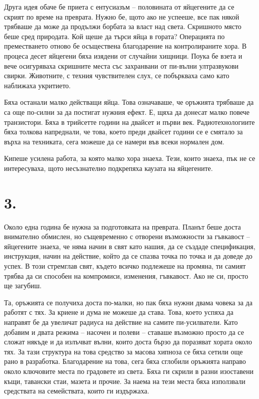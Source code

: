 \documentclass[ebook,openany,12pt]{memoir}
\begin{document}
Друга идея обаче бе приета с ентусиазъм – половината от яйцегените да се скрият по време на преврата. Нужно бе, щото ако не успееше, все пак някой трябваше да може да продължи борбата за власт над света. Скришното място беше сред природата. Кой щеше да търси яйца в гората? Операцията по преместването отново бе осъществена благодарение на контролираните хора. В процеса десет яйцегени бяха изядени от случайни хищници. Поука бе взета и вече осигуряваха скришните места със захранвани от пи-вълни ултразвукови свирки. Животните, с техния чувствителен слух, се побъркваха само като наближаха укритието.

Бяха останали малко действащи яйца. Това означаваше, че оръжията трябваше да са още по-силни за да постигат нужния ефект. Е, щяха да донесат малко повече транзистори. Бяха в трийсетте години на двайсет и първи век. Радиотехнологиите бяха толкова напреднали, че това, което преди двайсет години се е смятало за върха на техниката, сега можеше да се намери във всеки нормален дом.

Кипеше усилена работа, за която малко хора знаеха. Тези, които знаеха, пък не се интересуваха, щото несъзнателно подкрепяха каузата на яйцегените.

\section*{3.}

Около една година бе нужна за подготовката на преврата. Планът беше доста внимателно обмислен, но същевременно с отворени възможности за гъвкавост – яйцегените знаеха, че няма начин в свят като нашия, да се създаде спецификация, инструкция, начин на действие, който да се спазва точка по точка и да доведе до успех. В този стремглав свят, където всичко подлежеше на промяна, ти самият трябва да си способен на компромиси, изменения, гъвкавост. Ако не си, просто ще загубиш.

Та, оръжията се получиха доста по-малки, но пак бяха нужни двама човека за да работят с тях. За криене и дума не можеше да става. Това, което успяха да направят бе да увеличат радиуса на действие на самите пи-усилватели. Като добавим и двата режима – насочен и полеви – ставаше възможно просто да се сложат някъде и да излъчват вълни, които доста бързо да поразяват хората около тях. За тази структура на това средство за масова хипноза се бяха сетили още рано в разработка. Благодарение на това, сега бяха сглобили оръжията направо около ключовите места по градовете из света. Бяха ги скрили в разни изоставени къщи, тавански стаи, мазета и прочие. За наема на тези места бяха използвали средствата на семействата, които ги издържаха.
\end{document}
